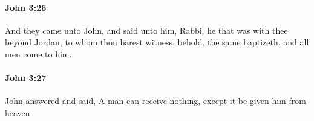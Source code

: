 		\paragraph{John 3:26} %
			\label{JOHN-3-26}

			And they came unto John, and said unto him, Rabbi, he that was with thee beyond Jordan, to whom thou barest witness, behold, the same baptizeth, and all men come to him.

			\begin{framed}
			\scriptsize
				\begin{compactdesc}
					\item[SBLG] 
				\end{compactdesc}
			\end{framed}

		\paragraph{John 3:27} %
			\label{JOHN-3-27}

			John answered and said, A man can receive nothing, except it be given him from heaven.

